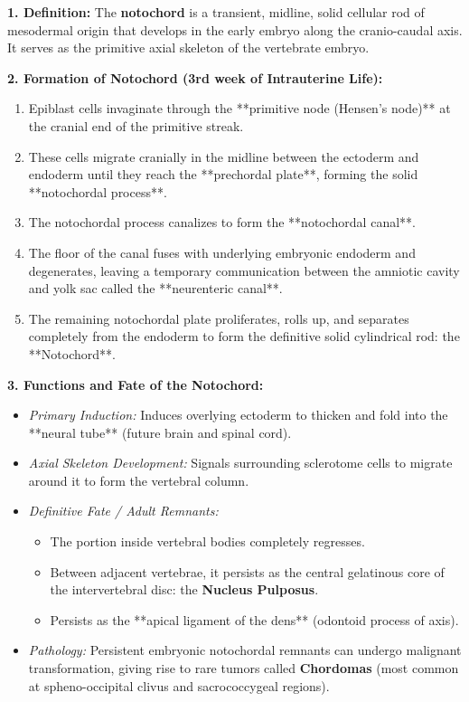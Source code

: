 \documentclass[11pt,a4paper]{article}
\begin{document}
\begin{ansbox}
\textbf{1. Definition:}
The \textbf{notochord} is a transient, midline, solid cellular rod of mesodermal origin that develops in the early embryo along the cranio-caudal axis. It serves as the primitive axial skeleton of the vertebrate embryo.

\textbf{2. Formation of Notochord (3rd week of Intrauterine Life):}
\begin{enumerate}[leftmargin=*]
    \item Epiblast cells invaginate through the **primitive node (Hensen's node)** at the cranial end of the primitive streak.
    \item These cells migrate cranially in the midline between the ectoderm and endoderm until they reach the **prechordal plate**, forming the solid **notochordal process**.
    \item The notochordal process canalizes to form the **notochordal canal**.
    \item The floor of the canal fuses with underlying embryonic endoderm and degenerates, leaving a temporary communication between the amniotic cavity and yolk sac called the **neurenteric canal**.
    \item The remaining notochordal plate proliferates, rolls up, and separates completely from the endoderm to form the definitive solid cylindrical rod: the **Notochord**.
\end{enumerate}

\textbf{3. Functions and Fate of the Notochord:}
\begin{itemize}[leftmargin=*]
    \item \textit{Primary Induction:} Induces overlying ectoderm to thicken and fold into the **neural tube** (future brain and spinal cord).
    \item \textit{Axial Skeleton Development:} Signals surrounding sclerotome cells to migrate around it to form the vertebral column.
    \item \textit{Definitive Fate / Adult Remnants:}
    \begin{itemize}
        \item The portion inside vertebral bodies completely regresses.
        \item Between adjacent vertebrae, it persists as the central gelatinous core of the intervertebral disc: the \textbf{Nucleus Pulposus}.
        \item Persists as the **apical ligament of the dens** (odontoid process of axis).
    \end{itemize}
    \item \textit{Pathology:} Persistent embryonic notochordal remnants can undergo malignant transformation, giving rise to rare tumors called \textbf{Chordomas} (most common at spheno-occipital clivus and sacrococcygeal regions).
\end{itemize}
\end{ansbox}
\end{document}
